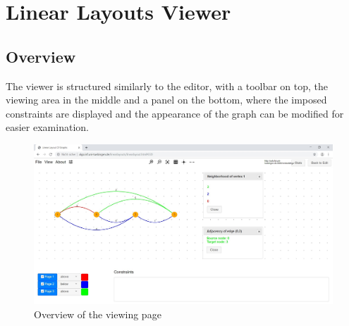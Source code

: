 \section{Linear Layouts Viewer}
\subsection{Overview}
The viewer is structured similarly to the editor, with a toolbar on top, the viewing area in the middle and a panel on the bottom, where the imposed constraints are displayed and the appearance of the graph can be modified for easier examination.
\begin{figure}[!h]
\begin{center}
\includegraphics[width=1\textwidth]{figures/figSecond/OverviewSecond.jpg}
\caption{Overview of the viewing page}
\label{img:plzhltr}
\end{center}
\end{figure}
